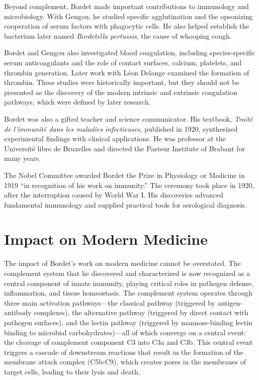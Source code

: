 Beyond complement, Bordet made important contributions to immunology and microbiology. With Gengou, he studied specific agglutination and the opsonizing cooperation of serum factors with phagocytic cells. He also helped establish the bacterium later named \emph{Bordetella pertussis}, the cause of whooping cough.\cite{bordet-history}

Bordet and Gengou also investigated blood coagulation, including species-specific serum anticoagulants and the role of contact surfaces, calcium, platelets, and thrombin generation. Later work with Léon Delange examined the formation of thrombin. These studies were historically important, but they should not be presented as the discovery of the modern intrinsic and extrinsic coagulation pathways, which were defined by later research.\cite{bordet-coagulation}

Bordet was also a gifted teacher and science communicator. His textbook, \emph{Trait{\'e} de l'immunit{\'e} dans les maladies infectieuses}, published in 1920, synthesized experimental findings with clinical applications. He was professor at the Universit\'e libre de Bruxelles and directed the Pasteur Institute of Brabant for many years.\cite{bordet-biographical}

The Nobel Committee awarded Bordet the Prize in Physiology or Medicine in 1919 ``in recognition of his work on immunity.'' The ceremony took place in 1920, after the interruption caused by World War I. His discoveries advanced fundamental immunology and supplied practical tools for serological diagnosis.\cite{nobel-1919,bordet-history}

\section{Impact on Modern Medicine}

The impact of Bordet's work on modern medicine cannot be overstated. The complement system that he discovered and characterized is now recognized as a central component of innate immunity, playing critical roles in pathogen defense, inflammation, and tissue homeostasis. The complement system operates through three main activation pathways---the classical pathway (triggered by antigen-antibody complexes), the alternative pathway (triggered by direct contact with pathogen surfaces), and the lectin pathway (triggered by mannose-binding lectin binding to microbial carbohydrates)---all of which converge on a central event: the cleavage of complement component C3 into C3a and C3b. This central event triggers a cascade of downstream reactions that result in the formation of the membrane attack complex (C5b-C9), which creates pores in the membranes of target cells, leading to their lysis and death.


